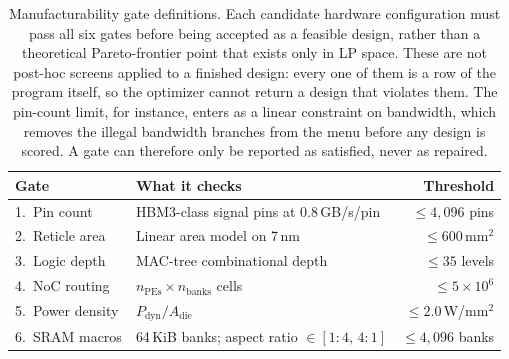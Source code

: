 \begin{table}[t]
\centering
\small
\caption{Manufacturability gate definitions. Each candidate hardware configuration must pass all six gates before being accepted as a feasible design, rather than a theoretical Pareto-frontier point that exists only in LP space. These are not post-hoc screens applied to a finished design: every one of them is a row of the program itself, so the optimizer cannot return a design that violates them. The pin-count limit, for instance, enters as a linear constraint on bandwidth, which removes the illegal bandwidth branches from the menu before any design is scored. A gate can therefore only be reported as satisfied, never as repaired.}
\label{tab:mfg_gates}
\begin{tabularx}{\linewidth}{lXr}
\toprule
\textbf{Gate} & \textbf{What it checks} & \textbf{Threshold} \\
\midrule
1.\ Pin count    &
  HBM3-class signal pins at $0.8$\,GB/s/pin &
  $\le 4{,}096$ pins \\[0.3em]
2.\ Reticle area &
  Linear area model on 7\,nm &
  $\le 600$\,mm$^2$ \\[0.3em]
3.\ Logic depth  &
  MAC-tree combinational depth &
  $\le 35$ levels \\[0.3em]
4.\ NoC routing  &
  $n_{\mathrm{PEs}} \times n_{\mathrm{banks}}$ cells &
  $\le 5\times10^6$ \\[0.3em]
5.\ Power density &
  $P_{\mathrm{dyn}} / A_{\mathrm{die}}$ &
  $\le 2.0$\,W/mm$^2$ \\[0.3em]
6.\ SRAM macros  &
  64\,KiB banks; aspect ratio $\in [1{:}4,\, 4{:}1]$ &
  $\le 4{,}096$ banks \\
\bottomrule
\end{tabularx}
\end{table}






